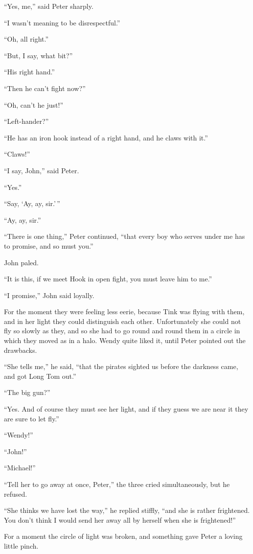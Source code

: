 ``Yes, me,'' said Peter sharply.

``I wasn't meaning to be disrespectful.''

``Oh, all right.''

``But, I say, what bit?''

``His right hand.''

``Then he can't fight now?''

``Oh, can't he just!''

``Left-hander?''

``He has an iron hook instead of a right hand, and he claws with it.''

``Claws!''

``I say, John,'' said Peter.

``Yes.''

``Say, ‘Ay, ay, sir.'\,''

``Ay, ay, sir.''

``There is one thing,'' Peter continued, ``that every boy who serves under me
has to promise, and so must you.''

John paled.

``It is this, if we meet Hook in open fight, you must leave him to me.''

``I promise,'' John said loyally.

For the moment they were feeling less eerie, because Tink was flying with them,
and in her light they could distinguish each other. Unfortunately she could not
fly so slowly as they, and so she had to go round and round them in a circle in
which they moved as in a halo. Wendy quite liked it, until Peter pointed out the
drawbacks.

``She tells me,'' he said, ``that the pirates sighted us before the darkness
came, and got Long Tom out.''

``The big gun?''

``Yes. And of course they must see her light, and if they guess we are near it
they are sure to let fly.''

``Wendy!''

``John!''

``Michael!''

``Tell her to go away at once, Peter,'' the three cried simultaneously, but he
refused.

``She thinks we have lost the way,'' he replied stiffly, ``and she is rather
frightened. You don't think I would send her away all by herself when she is
frightened!''

For a moment the circle of light was broken, and something gave Peter a loving
little pinch.

